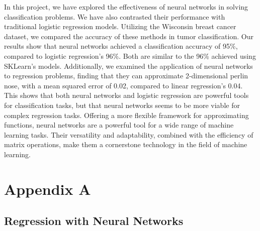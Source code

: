 \documentclass[twoside,11pt]{report}
\begin{document}
    In this project, we have explored the effectiveness of neural networks in solving classification problems. 
    We have also contrasted their performance with traditional logistic regression models. Utilizing the Wisconsin 
    breast cancer dataset, we compared the accuracy of these methods in tumor classification. Our results show that 
    neural networks achieved a classification accuracy of 95\%, compared to logistic regression's 96\%. Both are 
    similar to the 96\% achieved using SKLearn's models.
    Additionally, we examined the application of neural networks to regression problems, finding that they can 
    approximate 2-dimensional perlin nose, with a mean squared error of 0.02, compared to linear regression's 0.04. 
    This shows that both neural networks and logistic regression are powerful tools for classification tasks, 
    but that neural networks seems to be more viable for complex regression tasks. Offering a more flexible 
    framework for approximating functions, neural networks are a powerful tool for a wide range of machine learning 
    tasks. Their versatility and adaptability, combined with the efficiency of matrix operations, make them a 
    cornerstone technology in the field of machine learning.
     





















\clearpage 

\appendix
\renewcommand{\theHchapter}{appendix\Alph{chapter}}
\renewcommand{\theHsection}{appendix\thesection}

{}


\chapter*{Appendix A}
\label{app:appendixA}


\section{Regression with Neural Networks}
\label{sec:regression}
\end{document}
